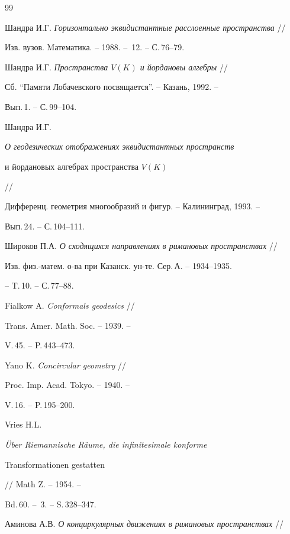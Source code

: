 \begin{thebibliography}{99}







Шандра И.Г. {\em Горизонтально эквидистантные расслоенные пространства} //


Изв. вузов. Mатематика. -- 1988. -- \No\,12. -- С.\,76--79.




Шандра И.Г. {\em Пространства $V(K)$ и йордановы алгебры} //


Сб. ``Памяти Лобачевского посвящается''. -- Казань, 1992. --


Вып.\,1. -- С.\,99--104.




Шандра И.Г. {\em О геодезических отображениях эквидистантных пространств


и йордановых алгебрах пространства $V(K)$} //


Дифференц. геометрия многообразий и фигур. -- Калининград, 1993. --


Вып.\,24. -- С.\,104--111.




Широков П.А. {\em О сходящихся направлениях в римановых пространствах} //


Изв. физ.-матем. о-ва при Казанск. ун-те. Сер.\,А. -- 1934--1935.


-- T.\,10. -- С.\,77--88.




Fialkow A. {\em Conformals geodesics} //


Trans. Amer. Math. Soc. -- 1939. --


V.\,45. -- P.\,443--473.




Yano K. {\em Concircular geometry} //


Proc. Imp. Acad. Tokyo. -- 1940. --


V.\,16. -- P.\,195--200.




Vries H.L. {\em \"Uber Riemannische R\"aume, die infinitesimale konforme


Transformationen gestatten} // Math Z. -- 1954. --


Bd.\,60. -- \No\,3. -- S.\,328--347.




Аминова А.В. {\em О конциркулярных движениях в римановых пространствах} //



\end{thebibliography}
